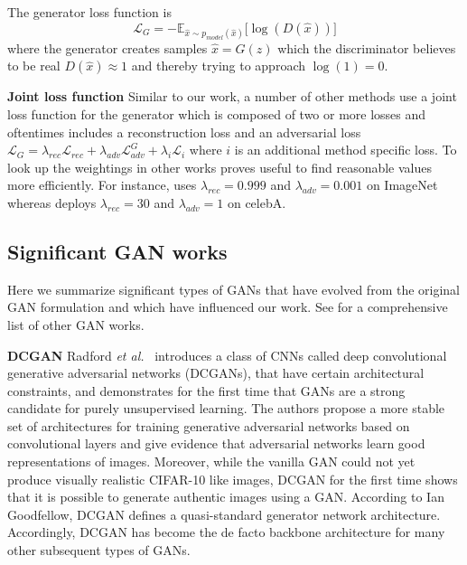 \documentclass[a4paper,12pt]{report}
\begin{document}
The generator loss function is
\begin{equation} \label{eq:g_loss}
    \mathcal{L}_{G} = -\mathbb{E}_{\hat{x}\sim p_{model} (\hat{x})}\big[\log(D(\hat{x}))\big]
\end{equation}
where the generator creates samples $\hat{x} = G(z)$ which the discriminator believes to be real $D(\hat{x}) \approx 1$ and thereby trying to approach $\log(1) = 0$.

\par \textbf{Joint loss function}
Similar to our work, a number of other methods \cite{1511.05440,DisentFacOfVarByMixTh,1604.07379} use a joint loss function for the generator which is composed of two or more losses and oftentimes includes a reconstruction loss and an adversarial loss $\mathcal{L}_G = \lambda_{rec}\mathcal{L}_{rec} + \lambda_{adv}\mathcal{L}^G_{adv} + \lambda_{i}\mathcal{L}_{i}$ where $i$ is an additional method specific loss. To look up the weightings in other works proves useful to find reasonable values more efficiently. For instance, \cite{1604.07379} uses $\lambda_{rec} = 0.999$ and $\lambda_{adv} = 0.001$ on ImageNet whereas \cite{DisentFacOfVarByMixTh} deploys $\lambda_{rec} = 30$ and $\lambda_{adv} = 1$ on celebA.

\subsection{Significant GAN works}\label{subsec:sign_gan_works}
Here we summarize significant types of GANs that have evolved from the original GAN formulation and which have influenced our work. See \cite{theGanZoo} for a comprehensive list of other GAN works.

\par \textbf{DCGAN} Radford \textit{et al.}~\cite{DCGAN} introduces a class of CNNs called deep convolutional generative adversarial networks (DCGANs), that have certain architectural constraints, and demonstrates for the first time that GANs are a strong candidate for purely unsupervised learning. The authors propose a more stable set of architectures for training generative adversarial networks based on convolutional layers and give evidence that adversarial networks learn good representations of images. Moreover, while the vanilla GAN could not yet produce visually realistic CIFAR-10 like images, DCGAN for the first time shows that it is possible to generate authentic images using a GAN. According to Ian Goodfellow, DCGAN defines a quasi-standard generator network architecture. Accordingly, DCGAN has become the de facto backbone architecture for many other subsequent types of GANs.
\end{document}
